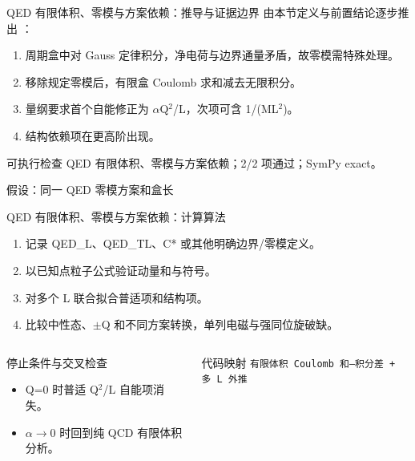 \begin{frame}[t]{QED 有限体积、零模与方案依赖：推导与证据边界}
\footnotesize
{}\quad 由本节定义与前置结论逐步推出 ：
\begin{enumerate}
\item 周期盒中对 Gauss 定律积分，净电荷与边界通量矛盾，故零模需特殊处理。
\item 移除规定零模后，有限盒 Coulomb 求和减去无限积分。
\item 量纲要求首个自能修正为 \ensuremath{\alpha}Q\ensuremath{^{2}}/\allowbreak{}L，次项可含 1/\allowbreak{}(ML\ensuremath{^{2}})。
\item 结构依赖项在更高阶出现。
\end{enumerate}\begin{block}{可执行检查}
\quad QED 有限体积、零模与方案依赖；2/2 项通过；SymPy exact。
\par\scriptsize 假设：同一 QED 零模方案和盒长
\end{block}
\end{frame}

\begin{frame}[t]{QED 有限体积、零模与方案依赖：计算算法}
\footnotesize
{}\begin{enumerate}
\item 记录 QED\_L、QED\_TL、C* 或其他明确边界/\allowbreak{}零模定义。
\item 以已知点粒子公式验证动量和与符号。
\item 对多个 L 联合拟合普适项和结构项。
\item 比较中性态、\ensuremath{\pm}Q 和不同方案转换，单列电磁与强同位旋破缺。
\end{enumerate}\begin{columns}[T,onlytextwidth]
\begin{block}{停止条件与交叉检查}\scriptsize\begin{itemize}
\item[\CheckMark] Q=0 时普适 Q\ensuremath{^{2}}/\allowbreak{}L 自能项消失。
\item[\CheckMark] \ensuremath{\alpha}\ensuremath{\rightarrow}0 时回到纯 QCD 有限体积分析。
\end{itemize}\end{block}
\begin{block}{代码映射}
\scriptsize \texttt{有限体积 Coulomb 和—积分差 + 多 L 外推}
\end{block}\end{columns}\end{frame}


